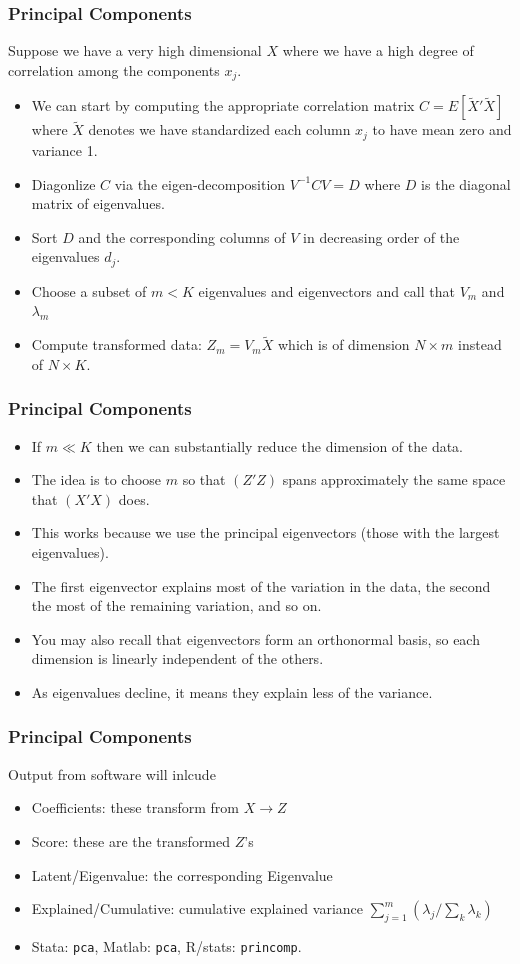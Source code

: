 \documentclass[xcolor=pdftex,dvipsnames,table,mathserif]{beamer}
\begin{document}
\begin{frame}
\frametitle{Principal Components}
Suppose we have a very high dimensional $X$ where we have a high degree of correlation among the components $x_j$. 
\begin{itemize}
\item We can start by computing the appropriate correlation matrix $C=E[\tilde{X}'\tilde{X}]$ where $\tilde{X}$ denotes we have standardized each column $x_j$ to have mean zero and variance 1.
\item Diagonlize $C$ via the eigen-decomposition $V^{-1} C V = D$ where $D$ is the diagonal matrix of eigenvalues.
\item Sort $D$ and the corresponding columns of $V$ in decreasing order of the eigenvalues $d_j$.
\item Choose a subset of $m < K$ eigenvalues and eigenvectors and call that $V_m$ and $\lambda_m$
\item Compute transformed data: $Z_m = V_m \tilde{X}$ which is of dimension $N \times m$ instead of $N \times K$.
\end{itemize}
\end{frame}

\begin{frame}
\frametitle{Principal Components}
\begin{itemize}
\item If $m \ll K$ then we can substantially reduce the dimension of the data.
\item The idea is to choose $m$ so that $(Z'Z)$ spans approximately the same space that $(X'X)$ does.
\item This works because we use the \alert{principal eigenvectors} (those with the largest eigenvalues).
\item The first eigenvector explains most of the variation in the data, the second the most of the remaining variation, and so on.
\item You may also recall that eigenvectors form an \alert{orthonormal basis}, so each dimension is linearly independent of the others.
\item As eigenvalues decline, it means they explain less of the variance.
\end{itemize}
\end{frame}

\begin{frame}
\frametitle{Principal Components}
Output from software will inlcude
\begin{itemize}
\item Coefficients: these transform from $X\rightarrow Z$
\item Score: these are the transformed $Z$'s
\item Latent/Eigenvalue: the corresponding Eigenvalue
\item Explained/Cumulative: cumulative explained variance $ \sum_{j=1}^m( \lambda_j / \sum_k \lambda_k)$
\item Stata: \texttt{pca}, Matlab: \texttt{pca}, R/stats: \texttt{princomp}.
\end{itemize}
\end{frame}
\end{document}
